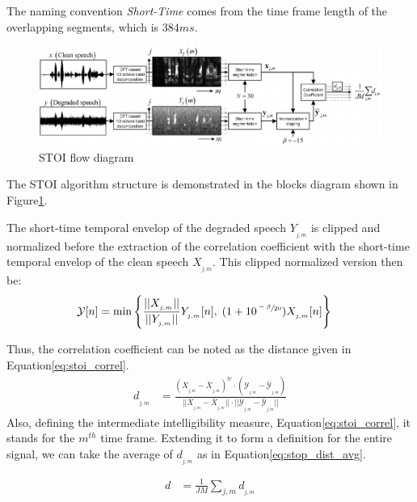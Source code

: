The naming convention \emph{Short-Time} comes from the time frame length
of the overlapping segments, which is \(384 ms\).  
\begin{figure}[H]
    \centering
    \includegraphics[width=\linewidth]{Features/images/stoi_blocks_diagram}
    \caption{STOI flow diagram}\label{fig:stoi_blocks_diagram}
\end{figure}

The STOI algorithm structure is demonstrated in 
the blocks diagram shown in Figure\;\ref{fig:stoi_blocks_diagram}. 

The short-time temporal envelop of the degraded
speech \(Y_{_{j,m}}\) is clipped and normalized
before the extraction of the correlation coefficient
with the short-time temporal envelop of the
clean speech \(X_{_{j,m}}\).
This clipped normalized version then be:
\begin{align}
    \mathcal{Y}[n] & = \min\Bigg\{ 
            \frac{||X_{_{j,m}}||}{||Y_{_{j,m}}||} Y_{_{j,m}}[n]
            ,\; (1+10^{\sfrac{-\beta}{20}})X_{_{j,m}}[n]
        \Bigg\}
\end{align}

Thus, the correlation coefficient can be noted as the
distance given in Equation\;\ref{eq:stoi_correl}.
\begin{align}\label{eq:stoi_correl}
    d_{_{j,m}} & = \frac{
            (X_{_{j,m}}-\bar{X}_{_{j,m}})^{tr} 
            \cdot (\mathcal{Y}_{_{j,m}}-\bar{\mathcal{Y}}_{_{j,m}})
        }
        {
            ||X_{_{j,m}}-\bar{X}_{_{j,m}}||
            \cdot ||\mathcal{Y}_{_{j,m}}-\bar{\mathcal{Y}}_{_{j,m}}|| 
        }
\end{align}
Also, defining the intermediate intelligibility measure, 
Equation\;\ref{eq:stoi_correl}, it stands for the
\(m^{th}\) time frame. Extending it to form
a definition for the entire signal,
we can take the average of \(d_{_{j,m}}\)
as in Equation\;\ref{eq:stop_dist_avg}.

\begin{align}\label{eq:stop_dist_avg}
    d & = \frac{1}{JM} \sum_{j,m} d_{_{j,m}}
\end{align}

